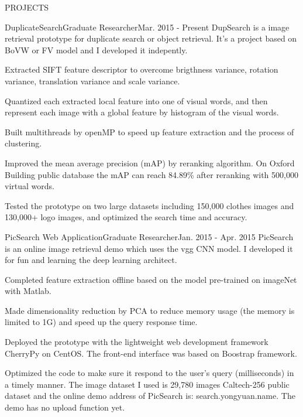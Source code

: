 \documentclass{resume} %
\begin{document}

\begin{rSection}{PROJECTS}

\begin{pSubsection}{DuplicateSearch}{Graduate Researcher}{Mar. 2015 - Present}
{DupSearch is a image retrieval prototype for duplicate search or object retrieval. It's a project based on BoVW or FV model and I developed it indepently.}
\item Extracted SIFT feature descriptor to overcome brigthness variance, rotation variance, translation variance and scale variance.
\item Quantized each extracted local feature into one of visual words, and then represent each image with a global feature by histogram of the visual words.
\item Built multithreads by openMP to speed up feature extraction and the process of clustering.
\item Improved the mean average precision (mAP) by reranking algorithm. On Oxford Building public database the mAP can reach 84.89\% after reranking with 500,000 virtual words.
\item Tested the prototype on two large datasets including 150,000 clothes images and 130,000+ logo images, and optimized the search time and accuracy.
\end{pSubsection}
\vspace{-0.5em}


\begin{pSubsection}{PicSearch Web Application}{Graduate Researcher}{Jan. 2015 - Apr. 2015}
{PicSearch is an online image retrieval demo which uses the vgg CNN model. I developed it for fun and learning the deep learning architect.}
\item Completed feature extraction offline based on the model pre-trained on imageNet with Matlab.
\item Made dimensionality reduction by PCA to reduce memory usage (the memory is limited to 1G) and speed up the query response time.
\item Deployed the prototype with the lightweight web development framework CherryPy on CentOS. The front-end interface was based on Boostrap framework.
\item Optimized the code to make sure it respond to the user's query (milliseconds) in a timely manner. The image dataset I used is 29,780 images Caltech-256 public dataset and the online demo address of PicSearch is: search.yongyuan.name. The demo has no upload function yet.
\end{pSubsection}
\vspace{-0.5em}


\end{rSection}
\end{document}
